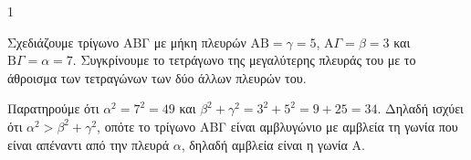 \begin{ylh}{1}
    \item [Ύλη από εικόνα]
\end{ylh}

\begin{figure} %
    \centering
\end{figure}
Σχεδιάζουμε τρίγωνο ΑΒΓ με μήκη πλευρών $\text{AB} = \gamma = 5$, $\text{A}\Gamma = \beta = 3$ και $\text{B}\Gamma = \alpha = 7$. Συγκρίνουμε το τετράγωνο της μεγαλύτερης πλευράς του με το άθροισμα των τετραγώνων των δύο άλλων πλευρών του.

Παρατηρούμε ότι $\alpha^2 = 7^2 = 49$ και $\beta^2 + \gamma^2 = 3^2 + 5^2 = 9 + 25 = 34$. Δηλαδή ισχύει ότι $\alpha^2 > \beta^2 + \gamma^2$, οπότε το τρίγωνο ΑΒΓ είναι αμβλυγώνιο με αμβλεία τη γωνία που είναι απέναντι από την πλευρά $\alpha$, δηλαδή αμβλεία είναι η γωνία A.

